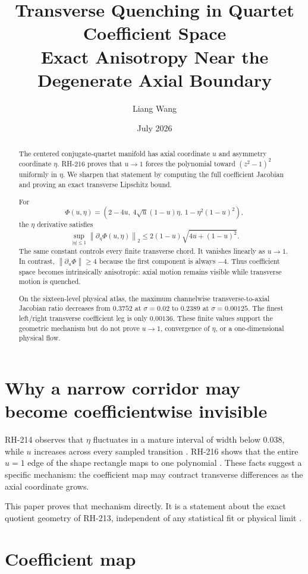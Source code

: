 \documentclass[12pt]{article}
\title{Transverse Quenching in Quartet Coefficient Space\\
\large Exact Anisotropy Near the Degenerate Axial Boundary}
\author{Liang Wang}\date{July 2026}
\theoremstyle{remark}\newtheorem{remark}[theorem]{Remark}
\newcommand{\norm}[1]{\left\lVert#1\right\rVert}
\begin{document}
\maketitle
\begin{abstract}
The centered conjugate-quartet manifold has axial coordinate $u$ and
asymmetry coordinate $\eta$.  RH-216 proves that $u\to1$ forces the
polynomial toward $(z^2-1)^2$ uniformly in $\eta$.  We sharpen that statement
by computing the full coefficient Jacobian and proving an exact transverse
Lipschitz bound.

For
\[
 \Phi(u,\eta)=(2-4u,\ 4\sqrt u(1-u)\eta,\
                 1-\eta^2(1-u)^2),
\]
the $\eta$ derivative satisfies
\[
 \sup_{|\eta|\le1}\norm{\partial_\eta\Phi(u,\eta)}_2
 \le 2(1-u)\sqrt{4u+(1-u)^2}.
\]
The same constant controls every finite transverse chord.  It vanishes
linearly as $u\to1$.  In contrast,
$\norm{\partial_u\Phi}\ge4$ because the first component is always $-4$.
Thus coefficient space becomes intrinsically anisotropic: axial motion
remains visible while transverse motion is quenched.

On the sixteen-level physical atlas, the maximum channelwise
transverse-to-axial Jacobian ratio decreases from $0.3752$ at
$\sigma=0.02$ to $0.2389$ at $\sigma=0.00125$.  The finest left/right
transverse coefficient leg is only $0.00136$.  These finite values support
the geometric mechanism but do not prove $u\to1$, convergence of $\eta$, or
a one-dimensional physical flow.
\end{abstract}

\section{Why a narrow corridor may become coefficientwise invisible}

RH-214 observes that $\eta$ fluctuates in a mature interval of width below
$0.038$, while $u$ increases across every sampled transition
\citep{WangRH214}.  RH-216 shows that the entire $u=1$ edge of the shape
rectangle maps to one polynomial \citep{WangRH216}.  These facts suggest a
specific mechanism: the coefficient map may contract transverse differences
as the axial coordinate grows.

This paper proves that mechanism directly.  It is a statement about the
exact quotient geometry of RH-213, independent of any statistical fit or
physical limit \citep{WangRH213}.

\section{Coefficient map}
\end{document}
